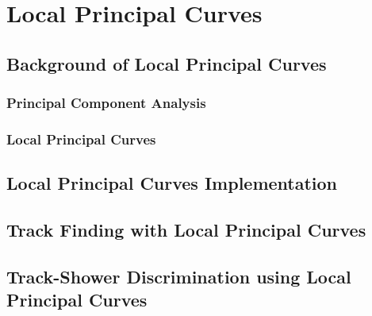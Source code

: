 \chapter{Local Principal Curves}

\section{Background of Local Principal Curves} 
\subsection{Principal Component Analysis}
\subsection{Local Principal Curves}

\section{Local Principal Curves Implementation}

\section{Track Finding with Local Principal Curves}

\section{Track-Shower Discrimination using Local Principal Curves}
